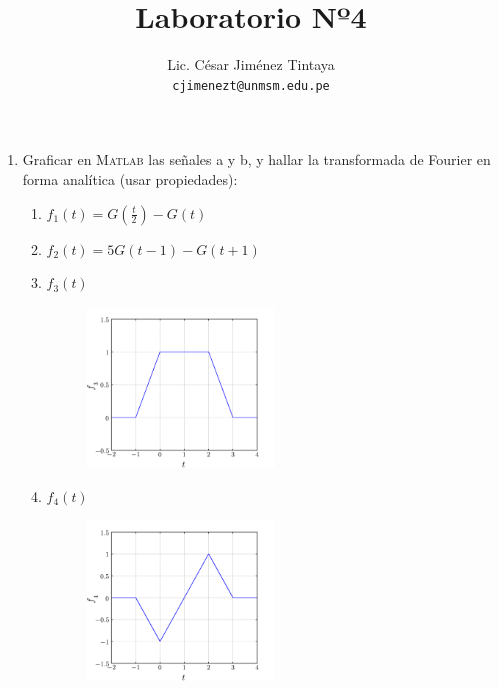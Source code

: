 \documentclass[a4paper,11pt,final]{article}
\begin{document}
  \title{Laboratorio Nº4}
  \author{Lic. César Jiménez Tintaya\\ \small{\texttt{cjimenezt@unmsm.edu.pe}}}
  \date{}
  \maketitle

  \begin{enumerate}
    \item Graficar en \textsc{Matlab} las señales a y b, y hallar
      la transformada de Fourier en forma analítica (usar propiedades):

      \begin{enumerate}
        \item $f_1\left(t\right) = G\left(\frac{t}{2}\right) - G\left(t\right)$
        \item $f_2\left(t\right) = 5G\left(t-1\right) - G\left(t+1\right)$
        \item $f_3\left(t\right)$
          \vspace{-1.5em}
          \begin{figure}[H]
            \begin{center}
              \includegraphics[width=0.5\textwidth]{./lab4prob1c.png}
            \end{center}
          \end{figure}\vspace{-2.5em}

        \item $f_4\left(t\right)$
          \vspace{-1.5em}
          \begin{figure}[H]
            \begin{center}
              \includegraphics[width=0.5\textwidth]{./lab4prob1d.png}
            \end{center}
          \end{figure}\vspace{-2.5em}
      \end{enumerate}


\end{enumerate}
\end{document}
